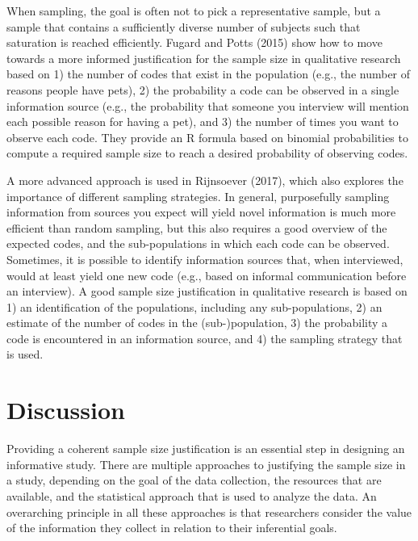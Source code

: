 \documentclass[
  english,
  ,jou, a4paper,floatsintext]{apa6}
\begin{document}
When sampling, the goal is often not to pick a representative sample, but a sample that contains a sufficiently diverse number of subjects such that saturation is reached efficiently. Fugard and Potts (2015) show how to move towards a more informed justification for the sample size in qualitative research based on 1) the number of codes that exist in the population (e.g., the number of reasons people have pets), 2) the probability a code can be observed in a single information source (e.g., the probability that someone you interview will mention each possible reason for having a pet), and 3) the number of times you want to observe each code. They provide an R formula based on binomial probabilities to compute a required sample size to reach a desired probability of observing codes.

A more advanced approach is used in Rijnsoever (2017), which also explores the importance of different sampling strategies. In general, purposefully sampling information from sources you expect will yield novel information is much more efficient than random sampling, but this also requires a good overview of the expected codes, and the sub-populations in which each code can be observed. Sometimes, it is possible to identify information sources that, when interviewed, would at least yield one new code (e.g., based on informal communication before an interview). A good sample size justification in qualitative research is based on 1) an identification of the populations, including any sub-populations, 2) an estimate of the number of codes in the (sub-)population, 3) the probability a code is encountered in an information source, and 4) the sampling strategy that is used.

\hypertarget{discussion}{%
\section{Discussion}\label{discussion}}

Providing a coherent sample size justification is an essential step in designing an informative study. There are multiple approaches to justifying the sample size in a study, depending on the goal of the data collection, the resources that are available, and the statistical approach that is used to analyze the data. An overarching principle in all these approaches is that researchers consider the value of the information they collect in relation to their inferential goals.
\end{document}
